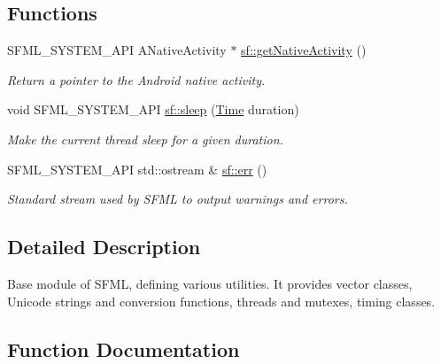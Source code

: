 \subsection*{Functions}
\begin{DoxyCompactItemize}
\item 
S\+F\+M\+L\+\_\+\+S\+Y\+S\+T\+E\+M\+\_\+\+A\+PI A\+Native\+Activity $\ast$ \mbox{\hyperlink{group__system_ga9f5460043bdbd5be0ccccd2e6f0ddc41}{sf\+::get\+Native\+Activity}} ()
\begin{DoxyCompactList}\small\item\em Return a pointer to the Android native activity. \end{DoxyCompactList}\item 
void S\+F\+M\+L\+\_\+\+S\+Y\+S\+T\+E\+M\+\_\+\+A\+PI \mbox{\hyperlink{group__system_ga2f2620831533dee0ed432ed982342e09}{sf\+::sleep}} (\mbox{\hyperlink{classsf_1_1_time}{Time}} duration)
\begin{DoxyCompactList}\small\item\em Make the current thread sleep for a given duration. \end{DoxyCompactList}\item 
S\+F\+M\+L\+\_\+\+S\+Y\+S\+T\+E\+M\+\_\+\+A\+PI std\+::ostream \& \mbox{\hyperlink{group__system_ga7fe7f475639e26334606b5142c29551f}{sf\+::err}} ()
\begin{DoxyCompactList}\small\item\em Standard stream used by S\+F\+ML to output warnings and errors. \end{DoxyCompactList}\end{DoxyCompactItemize}


\subsection{Detailed Description}
Base module of S\+F\+ML, defining various utilities. It provides vector classes, Unicode strings and conversion functions, threads and mutexes, timing classes. \begin{DoxyVerb}\end{DoxyVerb}
 

\subsection{Function Documentation}
\mbox{\label{group__system_ga7fe7f475639e26334606b5142c29551f}} 

